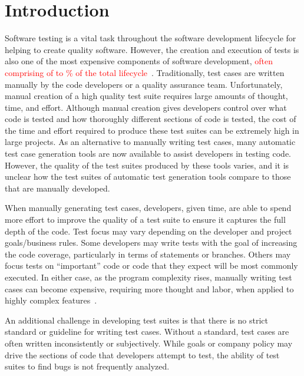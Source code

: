 
\section{Introduction}

Software testing is a vital task throughout the software development lifecycle for helping to create quality software.  However, the creation and execution of tests is also one of the most expensive components of software development, \textcolor{red}{often comprising of  to \% of the total lifecycle}~\cite{}.  Traditionally, test cases are written manually by the code developers or a quality assurance team.  Unfortunately, manual creation of a high quality test suite requires large amounts of thought, time, and effort. Although manual creation gives developers control over what code is tested and how thoroughly different sections of code is tested,  the cost of the time and effort required to produce these test suites can be extremely high in large projects.  As an alternative to manually writing test cases, many automatic test case generation tools are now available to assist developers in testing code.  However, the quality of the test suites produced by these tools varies, and it is unclear how the test suites of automatic test generation tools compare to those that are manually developed.

When manually generating test cases, developers, given time, are able to spend more effort to improve the quality of a test suite to ensure it captures the full depth of the code.  Test focus may vary depending on the developer and project goals/business rules.  Some developers may write tests with the goal of increasing the code coverage, particularly in terms of statements or branches.  Others may focus tests on ``important'' code or code that they expect will be most commonly executed.   In either case, as the program complexity rises, manually writing test cases can become expensive, requiring more thought and labor, when applied to highly complex features~\cite{clarke1998automated}.

An additional challenge in developing test suites is that there is no strict standard or guideline for writing test cases.  Without a standard, test cases are often written inconsistently or subjectively.  While goals or company policy may drive the sections of code that developers attempt to test, the ability of test suites to find bugs is not frequently analyzed.

